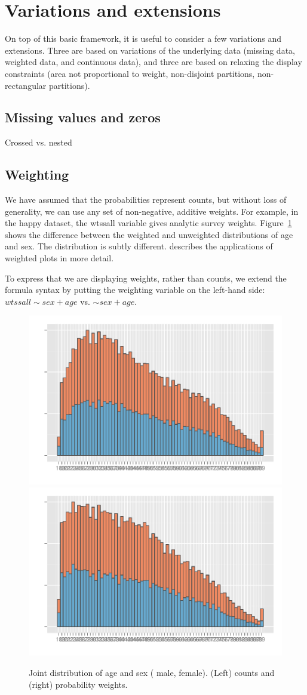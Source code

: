 \documentclass[journal]{vgtc}
\newcommand{\key}[1]
  {\protect \tikz{\fill[#1] rectangle (1ex,1ex);}}
\begin{document}
\section{Variations and extensions}
\label{sec:variations}

On top of this basic framework, it is useful to consider a few variations and extensions.  Three are based on variations of the underlying data (missing data, weighted data, and continuous data), and three are based on relaxing the display constraints (area not proportional to weight, non-disjoint partitions, non-rectangular partitions).


\subsection{Missing values and zeros}
\label{sub:missing_values}

Crossed vs. nested

\subsection{Weighting}
\label{sub:weighting}

We have assumed that the probabilities represent counts, but without loss of generality, we can use any set of non-negative, additive weights. For example, in the happy dataset, the {\sf wtssall} variable gives analytic survey weights. Figure~\ref{fig:weighting} shows the difference between the weighted and unweighted distributions of age and sex. The distribution is subtly different. \citep{unwin:2007} describes the applications of weighted plots in more detail.

To express that we are displaying weights, rather than counts, we extend the formula syntax by putting the weighting variable on the left-hand side: $wtssall \sim sex + age$ vs. $ \sim sex + age$.

\begin{figure}[htbp]
  \centering
    \includegraphics[width=0.5\linewidth]{wt-count}%
    \includegraphics[width=0.5\linewidth]{wt-wtssall}%
  \caption{Joint distribution of age and sex (\key{male} male, \key{female} female). (Left) counts and (right) probability weights.}
  \label{fig:weighting}
\end{figure}
\end{document}

